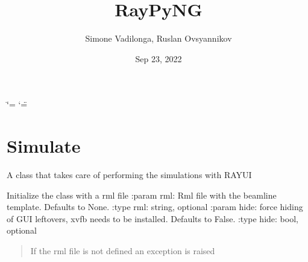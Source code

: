 \documentclass[letterpaper,10pt,english]{sphinxmanual}
\title{RayPyNG}
\date{Sep 23, 2022}
\author{Simone Vadilonga, Ruslan Ovsyannikov}
\begin{document}
\ifdefined\shorthandoff
  \ifnum\catcode`\=\string=\active\shorthandoff{=}\fi
  \ifnum\catcode`\"=\active{}\fi
\fi

\pagestyle{empty}
\sphinxmaketitle
\pagestyle{plain}
\sphinxtableofcontents
\pagestyle{normal}
\label{\detokenize{index::doc}}



\chapter{Simulate}
\label{\detokenize{index:simulate}}

\begin{fulllineitems}
\label{\detokenize{index:raypyng.simulate.Simulate}}
\pysigstartsignatures
{}
\pysigstopsignatures
\sphinxAtStartPar
A class that takes care of performing the simulations with RAY\sphinxhyphen{}UI

\begin{fulllineitems}
\label{\detokenize{index:raypyng.simulate.Simulate.__init__}}
\pysigstartsignatures
{}
\pysigstopsignatures
\sphinxAtStartPar
Initialize the class with a rml file
:param rml: Rml file with the beamline template. Defaults to None.
:type rml: string, optional
:param hide: force hiding of GUI leftovers, xvfb needs to be installed. Defaults to False.
:type hide: bool, optional
\begin{quote}\begin{description}
\sphinxAtStartPar
{} \textendash{} If the rml file is not defined an exception is raised

\end{description}\end{quote}


\end{fulllineitems}
\end{fulllineitems}
\end{document}
